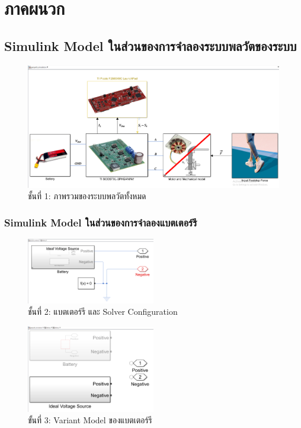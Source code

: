 \documentclass[11pt,a4paper]{article}
\begin{document}



\section{ภาคผนวก}

\subsection{Simulink Model ในส่วนของการจำลองระบบพลวัตของระบบ}

\begin{figure}[H]
    \centering
    \includegraphics[width=\textwidth]{layer0.png}
    \caption{ชั้นที่ 1: ภาพรวมของระบบพลวัตทั้งหมด}
\end{figure}

\subsubsection{Simulink Model ในส่วนของการจำลองแบตเตอร์รี}

\begin{figure}[H]
    \centering
    \includegraphics[width=0.5\textwidth]{layer1.png}
    \caption{ชั้นที่ 2: แบตเตอร์รี และ Solver Configuration}
\end{figure}

\begin{figure}[H]
    \centering
    \includegraphics[width=0.5\textwidth]{layer2-1.png}
    \caption{ขั้นที่ 3: Variant Model ของแบตเตอร์รี}
\end{figure}
\end{document}
